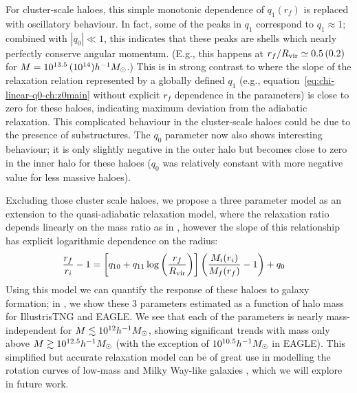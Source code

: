 For cluster-scale haloes, this simple monotonic dependence of $q_1(r_f)$ is replaced with oscillatory behaviour. In fact, some of the peaks in $q_1$ correspond to $q_1\approx1$; combined with $|q_0|\ll1$, this indicates that these peaks are shells which nearly perfectly conserve angular momentum. (E.g., this happens at $r_f/R_{\rm vir}\simeq0.5\,(0.2)$ for $M=10^{13.5}\,(10^{14})h^{-1}M_{\odot}$.)
This is in strong contrast to  where the slope of the relaxation relation represented by a globally defined $q_1$ (e.g., equation~\ref{eq:chi-linear-q0-ch:z0main} without explicit $r_f$ dependence in the parameters) is close to zero for these haloes, indicating maximum deviation from the adiabatic relaxation. This complicated behaviour in the cluster-scale haloes could be due to the presence of substructures. The $q_0$ parameter now also shows interesting behaviour; it is only slightly negative in the outer halo but becomes close to zero in the inner halo for these haloes ($q_0$ was relatively constant with more negative value for less massive haloes).
 

Excluding those cluster scale haloes, we propose a three parameter model as an extension to the quasi-adiabatic relaxation model, where the relaxation ratio depends linearly on the mass ratio as in , however the slope of this relationship has explicit logarithmic dependence on the radius:
\begin{align}
\label{eq:q3-model-ch:z0main}
\frac{r_f}{r_i} - 1 &=  \left[ q_{10} + q_{11} \log \left( \frac{r_f}{R_{\rm vir}} \right) \right] \left( \frac{M_i(r_i)}{M_f(r_f)} - 1 \right) + q_0
\end{align}
Using this model we can quantify the response of these haloes to galaxy formation;
in , we show these 3 parameters estimated as a function of halo mass for IllustrisTNG and EAGLE. We see that each of the parameters is nearly mass-independent for $M\lesssim10^{12}h^{-1}M_{\odot}$, showing significant trends with mass only above $M\gtrsim10^{12.5}h^{-1}M_{\odot}$ (with the exception of $10^{10.5} h^{-1}M_{\odot}$ in EAGLE). This simplified but accurate relaxation model can be of great use in modelling the rotation curves of low-mass and Milky Way-like galaxies \citep{2021MNRAS.503.4147P,2021MNRAS.507..632P}, which we will explore in future work.


